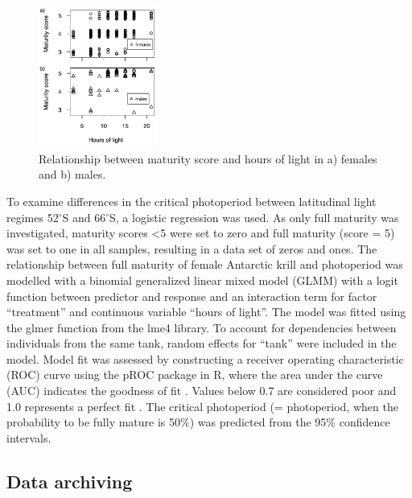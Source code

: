 \begin{figure}
       \vspace{-20pt}
        \centering
        \includegraphics[width=0.35\textwidth]{../Figures/Pub2_2.pdf}
        \vspace{-15pt}
        \caption{Relationship between maturity score and hours of light in a)
        females and b) males.}
        \label{Pub2_2}
         \vspace{-10pt}
\end{figure}

To examine differences in the critical photoperiod between latitudinal light
regimes 52$^{\circ}$S and 66$^{\circ}$S, a logistic regression was used. As
only full maturity was investigated, maturity scores <5 were set to zero and
full maturity (score = 5) was set to one in all samples, resulting in a data
set of zeros and ones. The relationship between full maturity of female
Antarctic krill and photoperiod was modelled with a binomial generalized linear
mixed model (GLMM) with a logit function between predictor and response and an
interaction term for factor “treatment” and continuous variable “hours of
light”. The model was fitted using the glmer function from the lme4 library. To
account for dependencies between individuals from the same tank, random effects
for “tank” were included in the model. Model fit was assessed by constructing a
receiver operating characteristic (ROC) curve using the pROC package in R,
where the area under the curve (AUC) indicates the goodness of fit
\citep{boyce_evaluating_2002}. Values below 0.7 are considered poor and 1.0
represents a perfect fit \citep{cumming_using_2000}. The critical photoperiod
(= photoperiod, when the probability to be fully mature is 50\%) was predicted
from the 95\% confidence intervals.

\subsection{Data archiving} 


